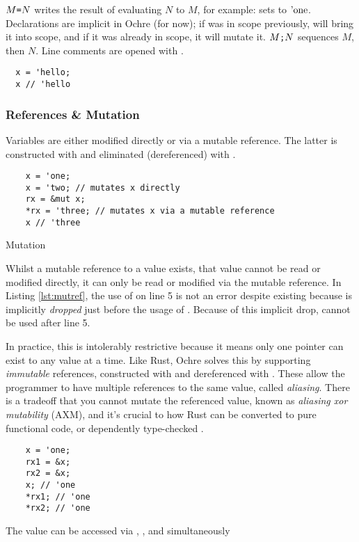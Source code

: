 \documentclass[12pt,twoside]{report}
\begin{document}
$M \text{\texttt{=}} N$ writes the result of evaluating $N$ to $M$, for example:  sets  to $\text{'one}$. Declarations are implicit in Ochre (for now); if  was in scope previously,  will bring it into scope, and if it was already in scope, it will mutate it. $M \text{\texttt{;}} N$ sequences $M$, then $N$. Line comments are opened with \mono{//}.

\begin{verbatim}
  x = 'hello;
  x // 'hello
\end{verbatim}

\subsubsection{References \& Mutation}
Variables are either modified directly or via a mutable reference. The latter is constructed with  and eliminated (dereferenced) with \mono{*}.

\begin{listing}[H]
  \begin{verbatim}
    x = 'one;
    x = 'two; // mutates x directly
    rx = &mut x;
    *rx = 'three; // mutates x via a mutable reference
    x // 'three
  \end{verbatim}
  \caption{Mutation}
  \label{lst:mutref}
\end{listing}

Whilst a mutable reference to a value exists, that value cannot be read or modified directly, it can only be read or modified via the mutable reference. In Listing \ref{lst:mutref}, the use of  on line 5 is not an error despite  existing because is implicitly \textit{dropped} just before the usage of . Because of this implicit drop,  cannot be used after line 5.

In practice, this is intolerably restrictive because it means only one pointer can exist to any value at a time. Like Rust, Ochre solves this by supporting \textit{immutable} references, constructed with \mono{\&} and dereferenced with \mono{*}. These allow the programmer to have multiple references to the same value, called \textit{aliasing}. There is a tradeoff that you cannot mutate the referenced value, known as \textit{aliasing xor mutability} (AXM), and it's crucial to how Rust can be converted to pure functional code, or dependently type-checked \citep{aeneas,ullrichKhaElectrolysis2024}.

\begin{listing}[H]
  \begin{verbatim}
    x = 'one;
    rx1 = &x;
    rx2 = &x;
    x; // 'one
    *rx1; // 'one
    *rx2; // 'one
  \end{verbatim}
  \caption{The value  can be accessed via , , and  simultaneously}
  \label{lst:immref}
\end{listing}
\end{document}
